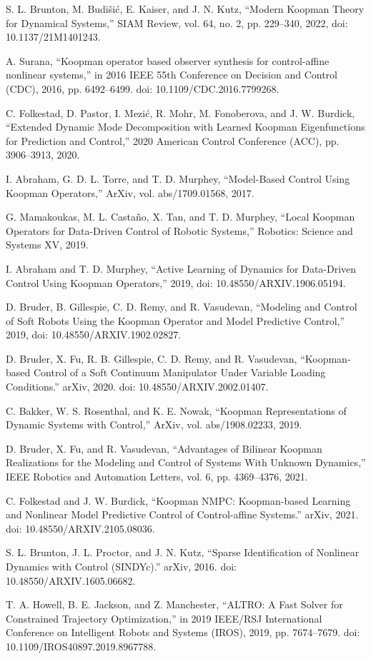 \documentclass[letterpaper, 10 pt, conference]{ieeeconf}  %
\begin{document}
\begin{thebibliography}{99}

 S. L. Brunton, M. Budišić, E. Kaiser, and J. N. Kutz, “Modern Koopman Theory for Dynamical Systems,” SIAM Review, vol. 64, no. 2, pp. 229–340, 2022, doi: 10.1137/21M1401243.

 A. Surana, “Koopman operator based observer synthesis for control-affine nonlinear systems,” in 2016 IEEE 55th Conference on Decision and Control (CDC), 2016, pp. 6492–6499. doi: 10.1109/CDC.2016.7799268.

 C. Folkestad, D. Pastor, I. Mezić, R. Mohr, M. Fonoberova, and J. W. Burdick, “Extended Dynamic Mode Decomposition with Learned Koopman Eigenfunctions for Prediction and Control,” 2020 American Control Conference (ACC), pp. 3906–3913, 2020.

 I. Abraham, G. D. L. Torre, and T. D. Murphey, “Model-Based Control Using Koopman Operators,” ArXiv, vol. abs/1709.01568, 2017.

 G. Mamakoukas, M. L. Castaño, X. Tan, and T. D. Murphey, “Local Koopman Operators for Data-Driven Control of Robotic Systems,” Robotics: Science and Systems XV, 2019.

 I. Abraham and T. D. Murphey, “Active Learning of Dynamics for Data-Driven Control Using Koopman Operators,” 2019, doi: 10.48550/ARXIV.1906.05194.

 D. Bruder, B. Gillespie, C. D. Remy, and R. Vasudevan, “Modeling and Control of Soft Robots Using the Koopman Operator and Model Predictive Control,” 2019, doi: 10.48550/ARXIV.1902.02827.

 D. Bruder, X. Fu, R. B. Gillespie, C. D. Remy, and R. Vasudevan, “Koopman-based Control of a Soft Continuum Manipulator Under Variable Loading Conditions.” arXiv, 2020. doi: 10.48550/ARXIV.2002.01407.


 C. Bakker, W. S. Rosenthal, and K. E. Nowak, “Koopman Representations of Dynamic Systems with Control,” ArXiv, vol. abs/1908.02233, 2019.

 D. Bruder, X. Fu, and R. Vasudevan, “Advantages of Bilinear Koopman Realizations for the Modeling and Control of Systems With Unknown Dynamics,” IEEE Robotics and Automation Letters, vol. 6, pp. 4369–4376, 2021.

 C. Folkestad and J. W. Burdick, “Koopman NMPC: Koopman-based Learning and Nonlinear Model Predictive Control of Control-affine Systems.” arXiv, 2021. doi: 10.48550/ARXIV.2105.08036.

 S. L. Brunton, J. L. Proctor, and J. N. Kutz, “Sparse Identification of Nonlinear Dynamics with Control (SINDYc).” arXiv, 2016. doi: 10.48550/ARXIV.1605.06682.

 T. A. Howell, B. E. Jackson, and Z. Manchester, “ALTRO: A Fast Solver for Constrained Trajectory Optimization,” in 2019 IEEE/RSJ International Conference on Intelligent Robots and Systems (IROS), 2019, pp. 7674–7679. doi: 10.1109/IROS40897.2019.8967788.


\end{thebibliography}
\end{document}
